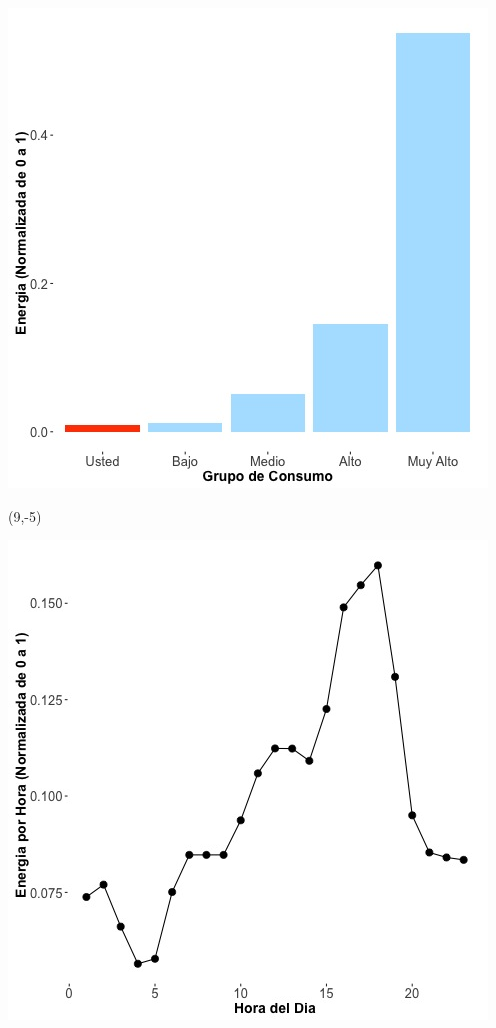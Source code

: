 \documentclass{article}\usepackage[]{graphicx}\usepackage[]{color}
\newenvironment{knitrout}{}{} %
\begin{document}
\begin{knitrout}
\color{fgcolor}
\includegraphics[scale=0.65]{figure/A22_neighbor_plot} 
\end{knitrout}

 \begin{textblock}{1}(9,-5)
\begin{minipage}{20em}
\begingroup

\endgroup
\end{minipage}
\end{textblock}


\begin{knitrout}
\color{fgcolor}
\includegraphics[scale=0.65]{figure/A22_plot_norm_median} 
\end{knitrout}
\end{document}
